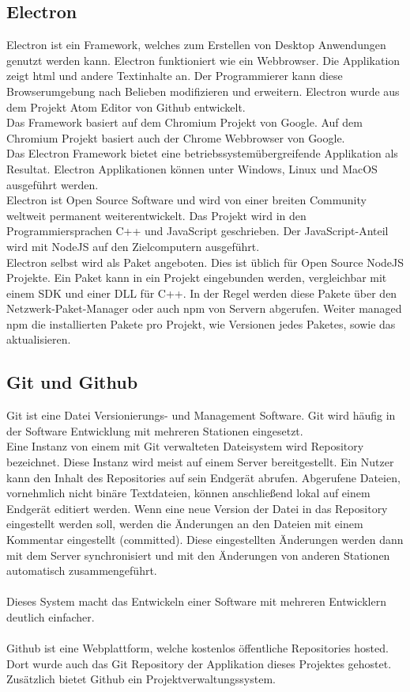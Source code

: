 \documentclass[11pt]{scrartcl}
\begin{document}
\subsection{Electron}
Electron ist ein Framework, welches zum Erstellen von Desktop Anwendungen genutzt werden kann. Electron funktioniert
wie ein Webbrowser. Die Applikation zeigt \ac{html} und andere Textinhalte an.\cite{electron} Der Programmierer kann diese
Browserumgebung nach Belieben modifizieren und erweitern. Electron wurde aus dem Projekt Atom Editor von Github entwickelt.\\
Das Framework basiert auf dem Chromium Projekt von Google. Auf dem Chromium Projekt basiert auch der Chrome Webbrowser von
Google.\\
Das Electron Framework bietet eine betriebssystemübergreifende Applikation als Resultat. Electron Applikationen können unter
Windows, Linux und MacOS ausgeführt werden.\\
Electron ist Open Source Software und wird von einer breiten Community weltweit permanent weiterentwickelt.\cite{electron} Das Projekt wird
in den Programmiersprachen C++ und JavaScript geschrieben. Der JavaScript-Anteil wird mit NodeJS auf den Zielcomputern ausgeführt.\\
Electron selbst wird als Paket angeboten. Dies ist üblich für Open Source NodeJS Projekte. Ein Paket kann in ein Projekt eingebunden werden,
vergleichbar mit einem SDK und einer DLL für C++. In der Regel werden diese Pakete über den Netzwerk-Paket-Manager oder auch \ac{npm} von
Servern abgerufen. Weiter managed \ac{npm} die installierten Pakete pro Projekt, wie Versionen jedes Paketes, sowie das aktualisieren.

\subsection{Git und Github}
Git ist eine Datei Versionierungs- und Management Software. Git wird häufig in der Software Entwicklung mit mehreren Stationen eingesetzt.\\
Eine Instanz von einem mit Git verwalteten Dateisystem wird Repository bezeichnet. Diese Instanz wird meist auf einem Server bereitgestellt.
Ein Nutzer kann den Inhalt des Repositories auf sein Endgerät abrufen.
Abgerufene Dateien, vornehmlich nicht binäre Textdateien, können anschließend lokal auf einem Endgerät editiert werden. Wenn eine neue Version
der Datei in das Repository eingestellt werden soll, werden die Änderungen an den Dateien mit einem Kommentar eingestellt (committed).
Diese eingestellten Änderungen werden dann mit dem Server synchronisiert und mit den Änderungen von anderen Stationen automatisch zusammengeführt.\\
\\
Dieses System macht das Entwickeln einer Software mit mehreren Entwicklern deutlich einfacher.\\
\\
Github ist eine Webplattform, welche kostenlos öffentliche Repositories hosted. Dort wurde auch das Git Repository der Applikation
dieses Projektes gehostet.\\
Zusätzlich bietet Github ein Projektverwaltungssystem.
\clearpage
\end{document}
